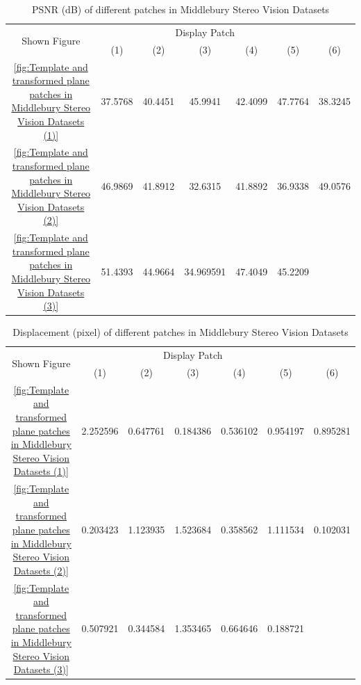 \begin{table}[htbp]
	\centering
	\scriptsize  
	\begin{tabular}{ccccccc} 
		\hline 
		\multicolumn{1}{c}{\multirow{2}{1.2cm}{Shown Figure}} 
		&\multicolumn{5}{c}{Display Patch}  \\ 
		\cline{2-7} 
		&\multicolumn{1}{c}{(1)} & {(2)} & {(3)} & {(4)} & {(5)} & {(6)} \\ 
		\hline 
		\cref{fig:Template and transformed plane patches in Middlebury Stereo Vision Datasets (1)} &37.5768&40.4451&45.9941&42.4099&47.7764&38.3245 \\ 
		\cref{fig:Template and transformed plane patches in Middlebury Stereo Vision Datasets (2)}&46.9869&41.8912&32.6315&41.8892&36.9338&49.0576\\ 
		 \cref{fig:Template and transformed plane patches in Middlebury Stereo Vision Datasets (3)}&51.4393&44.9664&34.969591&47.4049&45.2209&\\ 
		\hline 
	\end{tabular} 
	\caption{PSNR (dB) of different patches in  Middlebury Stereo Vision Datasets}  
	\label{tab:PSNR of different patches in  Middlebury Stereo Vision Datasets} 
\end{table}

\begin{table}[htbp]
	\centering
	\scriptsize  
	\begin{tabular}{ccccccc} 
		\hline 
		\multicolumn{1}{c}{\multirow{2}{1.2cm}{Shown Figure}} 
		&\multicolumn{5}{c}{Display Patch}  \\ 
		\cline{2-7} 
		&\multicolumn{1}{c}{(1)} & {(2)} & {(3)} & {(4)} & {(5)} & {(6)} \\ 
		\hline 
		\cref{fig:Template and transformed plane patches in Middlebury Stereo Vision Datasets (1)} &2.252596&0.647761&0.184386&0.536102&0.954197&0.895281\\ 
		\cref{fig:Template and transformed plane patches in Middlebury Stereo Vision Datasets (2)}&0.203423&1.123935&1.523684&0.358562&1.111534&0.102031\\ 
		\cref{fig:Template and transformed plane patches in Middlebury Stereo Vision Datasets (3)}&0.507921&0.344584&1.353465&0.664646&0.188721&\\ 
		\hline 
	\end{tabular} 
	\caption{Displacement (pixel) of different patches in  Middlebury Stereo Vision Datasets}  
	\label{tab:Displacement of different patches in  Middlebury Stereo Vision Datasets} 
\end{table}

